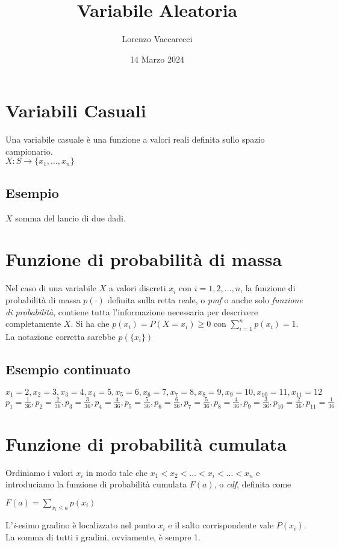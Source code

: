 \documentclass[12pt]{article}
\title{Variabile Aleatoria}
\author{Lorenzo Vaccarecci}
\date{14 Marzo 2024}
\begin{document}
\maketitle
\section{Variabili Casuali}
Una variabile casuale è una funzione a valori reali definita sullo spazio campionario.\\
\(X: S \rightarrow \{x_{1}, \dots, x_{n}\}\)
\subsection{Esempio}
$X$ somma del lancio di due dadi.
\section{Funzione di probabilità di massa}
Nel caso di una variabile $X$ a valori discreti $x_{i}$ con $i=1,2,\dots,n$, la funzione di probabilità di massa $p(\cdot)$ definita sulla retta reale, o \textit{pmf} o anche solo \textit{funzione di probabilità}, contiene tutta l'informazione necessaria per descrivere completamente $X$. Si ha che \(p(x_{i})=P(X=x_{i})\geq 0 \text{ con } \sum_{i=1}^{n}p(x_{i})=1\).\\
La notazione corretta sarebbe $p(\{x_{i}\})$
\subsection{Esempio continuato}
\(x_{1}=2,x_{2}=3,x_{3}=4,x_{4}=5,x_{5}=6,x_{6}=7,x_{7}=8,x_{8}=9,x_{9}=10,x_{10}=11,x_{11}=12\)\\
\(p_{1}=\frac{1}{36},p_{2}=\frac{2}{36},p_{3}=\frac{3}{36},p_{4}=\frac{4}{36},p_{5}=\frac{5}{36},p_{6}=\frac{6}{36},p_{7}=\frac{5}{36},p_{8}=\frac{4}{36},p_{9}=\frac{3}{36},p_{10}=\frac{2}{36},p_{11}=\frac{1}{36}\)
\section{Funzione di probabilità cumulata}
Ordiniamo i valori $x_{i}$ in modo tale che $x_{1}<x_{2}<\dots<x_{i}<\dots<x_{n}$ e introduciamo la funzione di probabilità cumulata $F(a)$, o \textit{cdf}, definita come
\begin{center}
    \(F(a)=\sum_{x_{i}\leq a}p(x_{i})\)
\end{center}
\begin{center}
\end{center}
L'\textit{i}-esimo gradino è localizzato nel punto $x_{i}$ e il salto corrispondente vale $P(x_{i})$. La somma di tutti i gradini, ovviamente, è sempre 1.
\end{document}

